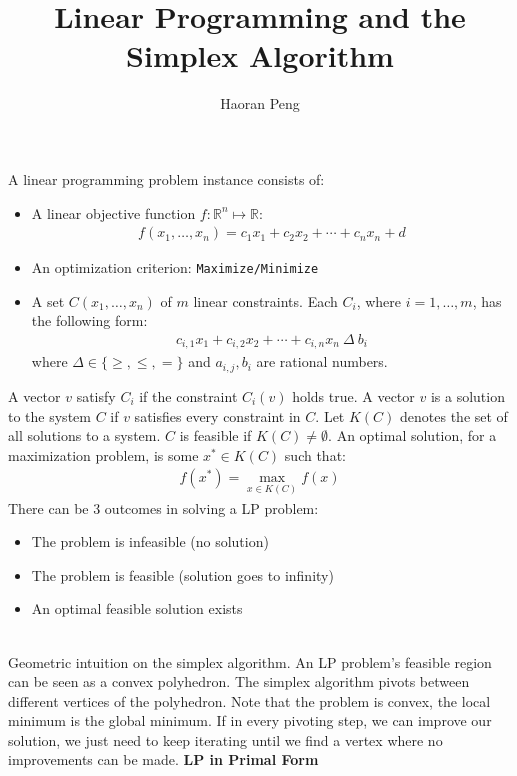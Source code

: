 \documentclass{article}
\begin{document}
	\title{Linear Programming and the Simplex Algorithm }
	\author{Haoran Peng}
	\maketitle

A linear programming problem instance consists of:
\begin{itemize}
\item A linear objective function $f : \mathbb{R}^n \mapsto \mathbb{R}$:
\begin{align*}
f(x_1, \ldots, x_n) = c_1x_1 + c_2x_2 + \cdots + c_nx_n + d
\end{align*}
\item An optimization criterion: \texttt{Maximize/Minimize}
\item A set $C(x_1, \ldots, x_n)$ of $m$ linear constraints. Each $C_i$, where $i = 1,\ldots, m$, has the following form:
\begin{align*}
c_{i,1}x_1 + c_{i,2}x_2 + \cdots + c_{i,n}x_n \ \Delta\ b_i
\end{align*}
where $\Delta \in \{\ge, \le, =\}$ and $a_{i,j}, b_i$ are rational numbers.
\end{itemize}
A vector $v$ satisfy $C_i$ if the constraint $C_i(v)$ holds true. A vector $v$ is a solution to the system $C$ if $v$ satisfies every constraint in $C$. Let $K(C)$ denotes the set of all solutions to a system. $C$ is feasible if $K(C) \neq \emptyset$. An optimal solution, for a maximization problem, is some $x^* \in K(C)$ such that:
\begin{align*}
f(x^*) = \max_{x\in K(C)} f(x)
\end{align*}
There can be 3 outcomes in solving a LP problem:
\begin{itemize}
\item The problem is infeasible (no solution)
\item The problem is feasible (solution goes to infinity)
\item An optimal feasible solution exists
\end{itemize}
~\\
Geometric intuition on the simplex algorithm. An LP problem's feasible region can be seen as a convex polyhedron. The simplex algorithm pivots between different vertices of the polyhedron. Note that the problem is convex, the local minimum is the global minimum. If in every pivoting step, we can improve our solution, we just need to keep iterating until we find a vertex where no improvements can be made.
\newpage
\textbf{LP in Primal Form}
\end{document}
